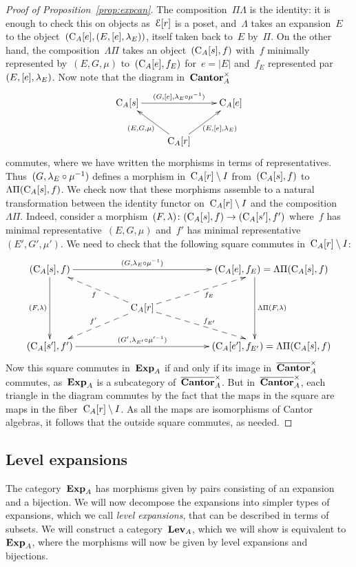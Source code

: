 \begin{proof}[Proof of Proposition~\ref{prop:expcan}]
The composition~$\Pi \Lambda$ is the identity: it is enough to check this on objects as~$\mathcal{E}[r]$ is a poset, and~$\Lambda$ takes an expansion~$E$ to the object~$(\mathrm{C}_A[e],(E,[e],\lambda_E))$, itself taken back to~$E$ by~$\Pi$. On the other hand, the composition~$\Lambda\Pi$ takes an object~$(\mathrm{C}_A[s],f)$ with~$f$ minimally represented by~$(E,G,\mu)$ to~$(\mathrm{C}_A[e],f_E)$ for~$e=|E|$ and~$f_E$ represented par~$(E,[e],\lambda_E)$. Now note that the diagram in~$\mathbf{Cantor}_A^\times$
$$\xymatrix{\rmC_A[s]\ar[rr]^-{(G,[e],\la_E\circ\mu^{-1})} &&\rmC_A[e] \\
& \ar[ul]^{(E,G,\mu)} \rmC_A[r]  \ar[ur]_{(E,[e],\la_E)}& }$$ 
commutes, where we have written the morphisms in terms of representatives. 
Thus~$(G,\lambda_E\circ\mu^{-1})$ defines a morphism in~$\mathrm{C}_A[r]\setminus I$ from~$(\mathrm{C}_A[s],f)$ to~$\Lambda\Pi(\mathrm{C}_A[s],f)$. We check now that these morphisms assemble to a natural transformation between the identity functor on~$\mathrm{C}_A[r]\setminus I$ and the composition~$\Lambda\Pi$. Indeed, consider a morphism~$(F,\lambda)\colon(\mathrm{C}_A[s],f)\to (\mathrm{C}_A[s'],f')$ where~$f$ has minimal representative~$(E,G,\mu)$ and~$f'$ has minimal representative~$(E',G', \mu')$. We need to check that the following square commutes in~$\mathrm{C}_A[r]\setminus I$: 
$$\xymatrix{(\rmC_A[s],f) \ar@{<--}[drr]_{f}\ar[dd]_{(F,\la)} \ar[rrrr]^-{(G,\la_E\circ\mu^{-1})} &&&& (\rmC_A[e],f_E)=\Lambda\Pi(\rmC_A[s],f) \ar@<-4ex>[dd]^{\Lambda\Pi(F,\la)} \ar@{<--}[dll]^{f_E} \\
&& \rmC_A[r] && \\
(\rmC_A[s'],f') \ar@{<--}[urr]^{f'}\ar[rrrr]^-{(G',\la_{E'}\circ\mu'^{-1})} &&&& (\rmC_A[e'],f_{E'}) =\Lambda\Pi(\rmC_A[s],f) \ar@{<--}[ull]_{f_{E'}}
}$$
Now this square commutes in~$\mathbf{Exp}_A$ if and only if its image in~$\overline{\mathbf{Cantor}}_A^\times$ commutes, as~$\mathbf{Exp}_A$ is a subcategory of~$\overline{\mathbf{Cantor}}_A^\times$. But in~$\overline{\mathbf{Cantor}}_A^\times$, each triangle in the diagram commutes by the fact that the maps in the square are maps in the fiber~$\mathrm{C}_A[r]\setminus I$. As all the maps are isomorphisms of Cantor algebras, it follows that the outside square commutes, as needed. 
\end{proof}


\subsection{Level expansions}\label{levexpsec}

The category~$\mathbf{Exp}_A$ has morphisms given by pairs consisting of an expansion and a bijection. We will now decompose the expansions into simpler types of expansions, which we call {\em level expansions}, that can be described in terms of subsets. We will construct a category~$\mathbf{Lev}_A$, which we will show is equivalent to~$\mathbf{Exp}_A$, where the morphisms will now be given by level expansions and bijections.

